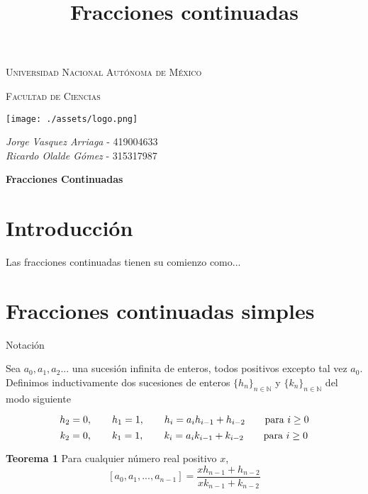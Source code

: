 \documentclass[11pt, article]{article}
\title{Fracciones continuadas}
\author{}
\date{}
\begin{document}
    \begin{center}
    {\scshape\LARGE Universidad Nacional Autónoma de México \par}

    \vspace{1cm}
    {\scshape\Large Facultad de Ciencias\par}
    \vspace{1.5cm}

    \begin{center}
        \texttt{[image: ./assets/logo.png]}
    \end{center}

    
    \vspace{0.5cm}
    \large{\itshape{Jorge Vasquez Arriaga}} \small{ - 419004633} \\ \vspace{0.3cm}
    \large{\itshape{Ricardo Olalde Gómez}} \small{ - 315317987} \\ \vspace{0.3cm}
    
    \vspace{.8 cm}

    {\LARGE \textbf{Fracciones Continuadas} \par}
    \end{center}


\section*{Introducción}
    Las fracciones continuadas tienen su comienzo como...
\section*{Fracciones continuadas simples}
    
    Notación
    
    Sea $a_0,a_1,a_2...$ una sucesión infinita de enteros, todos positivos excepto tal vez $a_0$. Definimos inductivamente dos sucesiones de enteros $\{h_n\}_{n\in\mathbb{N}}$ y $\{k_n\}_{n\in\mathbb{N}}$ del modo siguiente 
    
        \[
        h_2=0, \qquad h_1 =1, \qquad h_i=a_ih_{i-1} + h_{i-2} \qquad \textnormal{para } i\geq 0
        \]
        \[
        k_2=0, \qquad k_1 =1, \qquad k_i=a_ik_{i-1} + k_{i-2} \qquad \textnormal{para } i\geq 0
        \]
    
    \textbf{Teorema 1} Para cualquier número real positivo $x$,
        \[
        [a_0,a_1,...,a_{n-1}]=\dfrac{xh_{n-1}+h_{n-2}}{xk_{n-1}+k_{n-2}}
        \]
        
\end{document}
